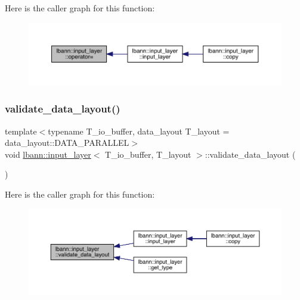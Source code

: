 Here is the caller graph for this function\+:\nopagebreak
\begin{figure}[H]
\begin{center}
\leavevmode
\includegraphics[width=350pt]{classlbann_1_1input__layer_a8b00d107daef436d141344277526b682_icgraph}
\end{center}
\end{figure}
\mbox{\label{classlbann_1_1input__layer_ae3c46c7e4d99b736ce8a3261abeac3e7}} 
\subsubsection{\texorpdfstring{validate\+\_\+data\+\_\+layout()}{validate\_data\_layout()}\hspace{0.1cm}{\footnotesize\ttfamily [1/5]}}
{\footnotesize\ttfamily template$<$typename T\+\_\+io\+\_\+buffer, data\+\_\+layout T\+\_\+layout = data\+\_\+layout\+::\+D\+A\+T\+A\+\_\+\+P\+A\+R\+A\+L\+L\+EL$>$ \\
void \hyperlink{classlbann_1_1input__layer}{lbann\+::input\+\_\+layer}$<$ T\+\_\+io\+\_\+buffer, T\+\_\+layout $>$\+::validate\+\_\+data\+\_\+layout (\begin{DoxyParamCaption}{ }\end{DoxyParamCaption})\hspace{0.3cm}{\ttfamily [inline]}}

Here is the caller graph for this function\+:\nopagebreak
\begin{figure}[H]
\begin{center}
\leavevmode
\includegraphics[width=350pt]{classlbann_1_1input__layer_ae3c46c7e4d99b736ce8a3261abeac3e7_icgraph}
\end{center}
\end{figure}
\mbox{\label{classlbann_1_1input__layer_a002a1f299fd8e63c13c4e27a61e86d61}} 
